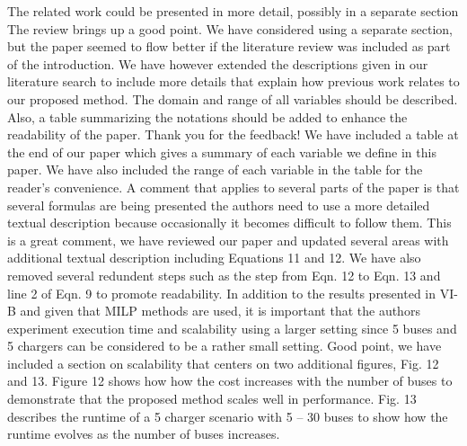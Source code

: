 \documentclass{article}
\begin{document}
\begin{buttkissing}
	\reviewerclaims The related work could be presented in more detail, possibly in a separate section
	\kissbutt The review brings up a good point.  We have considered using a separate section, but the paper seemed to flow better if the literature review was included as part of the introduction. We have however extended the descriptions given in our literature search to include more details that explain how previous work relates to our proposed method.  
	\reviewerclaims The domain and range of all variables should be described. Also, a table summarizing the notations should be added to enhance the readability of the paper.
	\kissbutt Thank you for the feedback! We have included a table at the end of our paper which gives a summary of each variable we define in this paper.  We have also included the range of each variable in the table for the reader's convenience.  
	\reviewerclaims A comment that applies to several parts of the paper is that several formulas are being presented the authors need to use a more detailed textual description because occasionally it becomes difficult to follow them.
	\kissbutt This is a great comment, we have reviewed our paper and updated several areas with additional textual description including Equations 11 and 12. We have also removed several redundent steps such as the step from Eqn. 12 to Eqn. 13 and line 2 of Eqn. 9 to promote readability.  
	\reviewerclaims In addition to the results presented in VI-B and given that MILP methods are used, it is important that the authors experiment execution time and scalability using a larger setting since 5 buses and 5 chargers can be considered to be a rather small setting.
	\kissbutt Good point, we have included a section on scalability that centers on two additional figures, Fig. 12 and 13. Figure 12 shows how how the cost increases with the number of buses to demonstrate that the proposed method scales well in performance. Fig. 13 describes the runtime of a 5 charger scenario with 5 -- 30 buses to show how the runtime evolves as the number of buses increases.  
\end{buttkissing}
\end{document}
